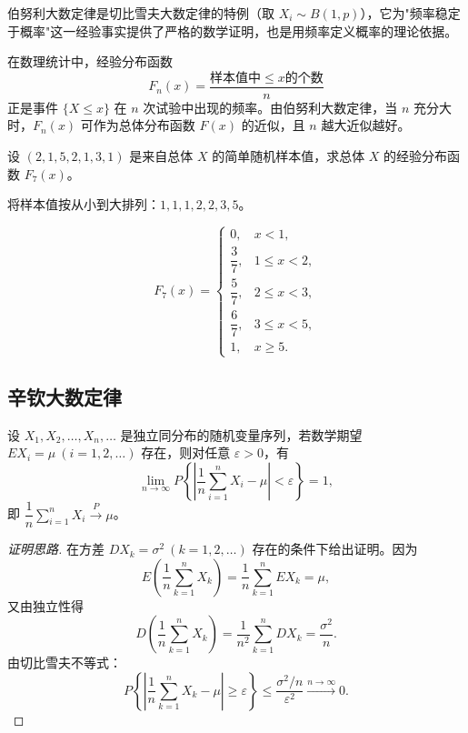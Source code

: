 \documentclass[lang=cn,11pt]{elegantbook}
\begin{document}
\begin{note}
伯努利大数定律是切比雪夫大数定律的特例（取 \(X_i \sim B(1,p)\)），它为"频率稳定于概率"这一经验事实提供了严格的数学证明，也是用频率定义概率的理论依据。

在数理统计中，经验分布函数
\[
F_n(x) = \frac{\text{样本值中} \leq x \text{的个数}}{n}
\]
正是事件 \(\{X \leq x\}\) 在 \(n\) 次试验中出现的频率。由伯努利大数定律，当 \(n\) 充分大时，\(F_n(x)\) 可作为总体分布函数 \(F(x)\) 的近似，且 \(n\) 越大近似越好。
\end{note}

\begin{exercise}\label{exer:5-empirical}
设 \((2, 1, 5, 2, 1, 3, 1)\) 是来自总体 \(X\) 的简单随机样本值，求总体 \(X\) 的经验分布函数 \(F_7(x)\)。
\end{exercise}

\begin{solution}
将样本值按从小到大排列：\(1, 1, 1, 2, 2, 3, 5\)。

\[
F_7(x) = \begin{cases}
0, & x < 1, \\
\dfrac{3}{7}, & 1 \leq x < 2, \\[6pt]
\dfrac{5}{7}, & 2 \leq x < 3, \\[6pt]
\dfrac{6}{7}, & 3 \leq x < 5, \\[6pt]
1, & x \geq 5.
\end{cases}
\]
\end{solution}

\subsection{辛钦大数定律}

\begin{theorem}[辛钦大数定律] \label{thm:khinchin-lln}
设 \(X_1, X_2, \dots, X_n, \dots\) 是独立同分布的随机变量序列，若数学期望 \(EX_i = \mu\ (i = 1, 2, \dots)\) 存在，则对任意 \(\varepsilon > 0\)，有
\[
\lim_{n\to\infty} P\!\left\{\left|\frac{1}{n}\sum_{i=1}^{n} X_i - \mu\right| < \varepsilon\right\} = 1,
\]
即 \(\dfrac{1}{n}\displaystyle\sum_{i=1}^{n} X_i \stackrel{P}{\longrightarrow} \mu\)。
\end{theorem}

\begin{proof}[证明思路]
在方差 \(DX_k = \sigma^2\ (k=1,2,\dots)\) 存在的条件下给出证明。因为
\[
E\!\left(\frac{1}{n}\sum_{k=1}^{n} X_k\right) = \frac{1}{n}\sum_{k=1}^{n} EX_k = \mu,
\]
又由独立性得
\[
D\!\left(\frac{1}{n}\sum_{k=1}^{n} X_k\right) = \frac{1}{n^2}\sum_{k=1}^{n} DX_k = \frac{\sigma^2}{n}.
\]
由切比雪夫不等式：
\[
P\!\left\{\left|\frac{1}{n}\sum_{k=1}^{n} X_k - \mu\right| \geq \varepsilon\right\}
\leq \frac{\sigma^2/n}{\varepsilon^2} \xrightarrow{n\to\infty} 0.
\]
\end{proof}
\end{document}
